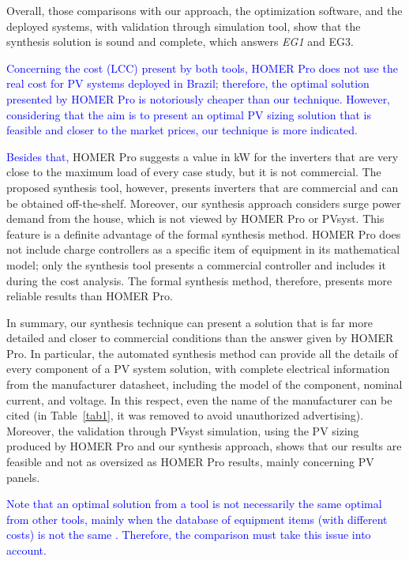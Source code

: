 \documentclass[runningheads]{llncs}
\begin{document}
Overall, those comparisons with our approach, the optimization software, and the deployed systems, with validation through simulation tool, show that the synthesis solution is sound and complete, which answers \textit{EG1} and {EG3}.

\textcolor{blue}{Concerning the cost (LCC) present by both tools, HOMER Pro does not use the real cost for PV systems deployed in Brazil; therefore, the optimal solution presented by HOMER Pro is notoriously cheaper than our technique. However, considering that the aim is to present an optimal PV sizing solution that is feasible and closer to the market prices, our technique is more indicated.}

\textcolor{blue}{Besides that,} HOMER Pro suggests a value in kW for the inverters that are very close to the maximum load of every case study, but it is not commercial. The proposed synthesis tool, however, presents inverters that are commercial and can be obtained off-the-shelf. Moreover, our synthesis approach considers surge power demand from the house, which is not viewed by HOMER Pro or PVsyst. This feature is a definite advantage of the formal synthesis method. HOMER Pro does not include charge controllers as a specific item of equipment in its mathematical model; only the synthesis tool presents a commercial controller and includes it during the cost analysis. The formal synthesis method, therefore, presents more reliable results than HOMER Pro.

In summary, our synthesis technique can present a solution that is far more detailed and closer to commercial conditions than the answer given by HOMER Pro. In particular, the automated synthesis method can provide all the details of every component of a PV system solution, with complete electrical information from the manufacturer datasheet, including the model of the component, nominal current, and voltage. In this respect, even the name of the manufacturer can be cited (in Table~\ref{tab1}, it was removed to avoid unauthorized advertising). Moreover, the validation through PVsyst simulation, using the PV sizing produced by HOMER Pro and our synthesis approach, shows that our results are feasible and not as oversized as HOMER Pro results, mainly concerning PV panels.

\textcolor{blue}{Note that an optimal solution from a tool is not necessarily the same optimal from other tools, mainly when the database of equipment items (with different costs) is not the same \cite{Alsadi2018}. Therefore, the comparison must take this issue into account.} 
\end{document}
